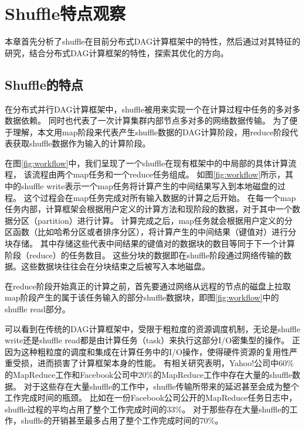 
\chapter{Shuffle特点观察}
\label{chap:observations}

本章首先分析了shuffle在目前分布式DAG计算框架中的特性，然后通过对其特征的研究，结合分布式DAG计算框架的特性，探索其优化的方向。

\section{Shuffle的特点}
在分布式并行DAG计算框架中，shuffle被用来实现一个在计算过程中任务的多对多数据依赖。
同时也代表了一次计算集群内部节点多对多的网络数据传输。
为了便于理解，本文用map阶段来代表产生shuffle数据的DAG计算阶段，用reduce阶段代表获取shuffle数据作为输入的计算阶段。

在图\ref{fig:workflow}中，我们呈现了一个shuffle在现有框架中的中局部的具体计算流程， 该流程由两个map任务和一个reduce任务组成。
如图\ref{fig:workflow}所示，其中的shuffle write表示一个map任务将计算产生的中间结果写入到本地磁盘的过程。
这个过程会在map任务完成对所有输入数据的计算之后开始。
在每一个map任务内部，计算框架会根据用户定义的计算方法和现阶段的数据，对于其中一个数据分区（partition）进行计算。
计算完成之后，map任务就会根据用户定义的分区函数（比如哈希分区或者排序分区），将计算产生的中间结果（键值对）进行分块存储。
其中存储这些代表中间结果的键值对的数据块的数目等同于下一个计算阶段（reduce）的任务数目。
这些分块的数据即在shuffle阶段通过网络传输的数据。这些数据块往往会在分块结束之后被写入本地磁盘。

在reduce阶段开始真正的计算之前，首先要通过网络从远程的节点的磁盘上拉取map阶段产生的属于该任务输入的部分shuffle数据块，即图\ref{fig:workflow}中的shuffle read部分。

可以看到在传统的DAG计算框架中，受限于粗粒度的资源调度机制，无论是shuffle write还是shuffle read都是由计算任务（task）来执行这部分I/O密集型的操作。
正因为这种粗粒度的调度和集成在计算任务中的I/O操作，使得硬件资源的复用性严重受损，进而损害了计算框架本身的性能。
有相关研究表明，Yahoo!公司中60\%的MapReduce工作和Facebook公司中20\%的MapReduce工作中存在大量的shuffle数据\cite{shufflewatcher}。
对于这些存在大量shuffle的工作中，shuffle传输所带来的延迟甚至会成为整个工作完成时间的瓶颈。
比如在一份Facebook公司公开的MapReduce任务日志中，shuffle过程的平均占用了整个工作完成时间的33\%。
对于那些存在大量shuffle的工作，shuffle的开销甚至最多占用了整个工作完成时间的70\%。

